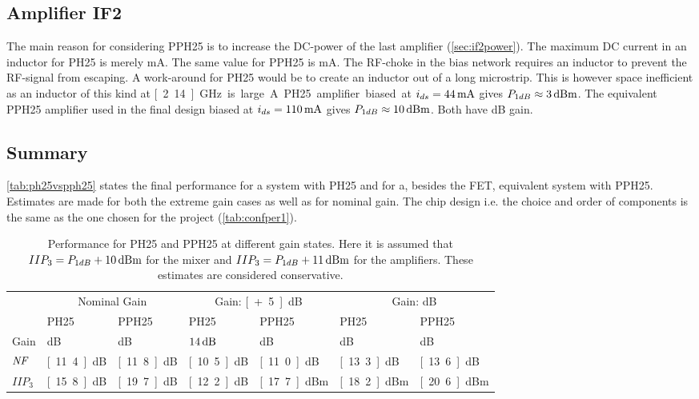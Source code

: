 		\subsection{Amplifier IF2}
			The main reason for considering PPH25 is to increase the DC-power of the last amplifier (\autoref{sec:if2power}). The maximum DC current in an inductor for PH25 is merely \unit[44]{mA}.\autocite{ph25manual} The same value for PPH25 is \unit[130]{mA}.\autocite{pph25manual} The RF-choke in the bias network requires an inductor to prevent the RF-signal from escaping. A work-around for PH25 would be to create an inductor out of a long microstrip. This is however space inefficient as an inductor of this kind at \unit[2.14]{GHz} is large.

			A PH25 amplifier biased at $i_{ds}=\unit[44]{mA}$ gives $P_{1dB}\approx \unit[3]{dBm}$. The equivalent PPH25 amplifier used in the final design biased at $i_{ds}=\unit[110]{mA}$ gives $P_{1dB}\approx \unit[10]{dBm}$. Both have \unit[12]{dB} gain.

		\subsection{Summary}
			\autoref{tab:ph25vspph25} states the final performance for a system with PH25 and for a, besides the FET, equivalent system with PPH25. Estimates are made for both the extreme gain cases as well as for nominal gain. The chip design i.e. the choice and order of components is the same as the one chosen for the project (\autoref{tab:confper1}).

			\begin{table}[hbt!]
				\caption[PH25 vs PPH25 chip performance.]{Performance for PH25 and PPH25 at different gain states. Here it is assumed that $IIP_3=P_{1dB}+\unit[10]{dBm}$ for the mixer and $IIP_3=P_{1dB}+\unit[11]{dBm}$ for the amplifiers. These estimates are considered conservative.}
				\label{tab:ph25vspph25}
				\centering
				\begin{tabular}{ l l l l l l l } \toprule
					& \multicolumn{2}{c}{Nominal Gain} & \multicolumn{2}{c}{Gain: \unit[+5]{dB}} & \multicolumn{2}{c}{Gain: \unit[-5]{dB}} \\\cmidrule{2-7}
					& PH25 & PPH25 & PH25 & PPH25 & PH25 & PPH25 \\\cmidrule{2-7}
					Gain & \unit[9]{dB} & \unit[9]{dB} & $\unit[14]{dB}$ & \unit[14]{dB} & \unit[4]{dB} & \unit[4]{dB} \\
					$\emph{NF}$ & \unit[11.4]{dB} & \unit[11.8]{dB} & \unit[10.5]{dB} & \unit[11.0]{dB} & \unit[13.3]{dB} & \unit[13.6]{dB} \\
					$IIP_3$ & \unit[15.8]{dB} & \unit[19.7]{dB} & \unit[12.2]{dB} & \unit[17.7]{dBm} & \unit[18.2]{dBm} & \unit[20.6]{dBm} \\\bottomrule
				\end{tabular}
			\end{table}

